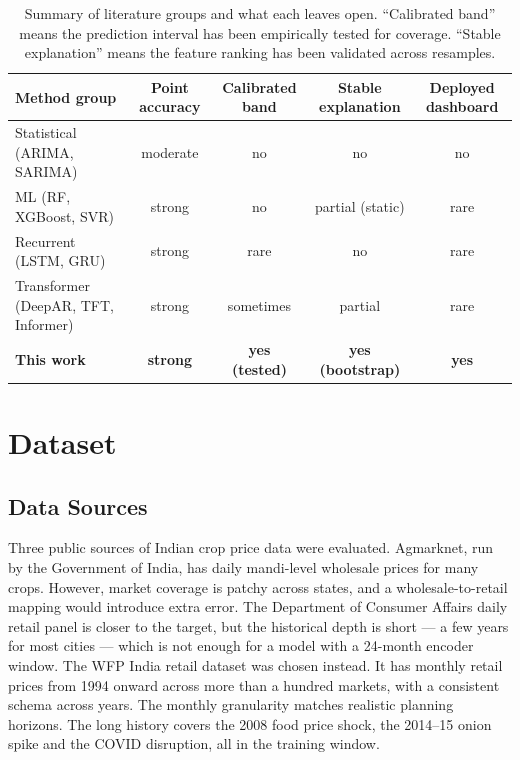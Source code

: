 \documentclass[conference,twoside]{IEEEtran}
\begin{document}
\begin{table}[!t]
\centering
\caption{Summary of literature groups and what each leaves open. ``Calibrated band'' means the prediction interval has been empirically tested for coverage. ``Stable explanation'' means the feature ranking has been validated across resamples.}
\label{tab:lit_summary}
\begin{tabular}{p{4.2cm}cccc}
\toprule
\textbf{Method group} & \textbf{Point accuracy} & \textbf{Calibrated band} & \textbf{Stable explanation} & \textbf{Deployed dashboard} \\
\midrule
Statistical (ARIMA, SARIMA)          & moderate & no  & no & no \\
ML (RF, XGBoost, SVR)                & strong   & no  & partial (static) & rare \\
Recurrent (LSTM, GRU)                & strong   & rare & no & rare \\
Transformer (DeepAR, TFT, Informer)  & strong   & sometimes & partial & rare \\
\textbf{This work}                   & \textbf{strong} & \textbf{yes (tested)} & \textbf{yes (bootstrap)} & \textbf{yes} \\
\bottomrule
\end{tabular}
\end{table}

\section{Dataset}
\label{sec:dataset}

\subsection{Data Sources}
Three public sources of Indian crop price data were evaluated. Agmarknet, run by the Government of India, has daily mandi-level wholesale prices for many crops. However, market coverage is patchy across states, and a wholesale-to-retail mapping would introduce extra error. The Department of Consumer Affairs daily retail panel is closer to the target, but the historical depth is short --- a few years for most cities --- which is not enough for a model with a 24-month encoder window. The WFP India retail dataset \cite{wfp2026dataset} was chosen instead. It has monthly retail prices from 1994 onward across more than a hundred markets, with a consistent schema across years. The monthly granularity matches realistic planning horizons. The long history covers the 2008 food price shock, the 2014--15 onion spike and the COVID disruption, all in the training window.
\end{document}
